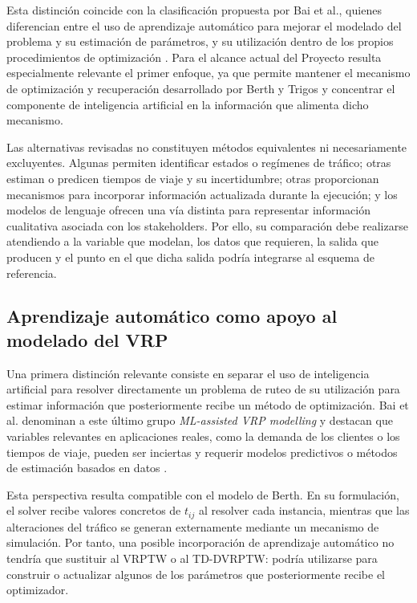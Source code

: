 \documentclass[11pt]{article}
\begin{document}
Esta distinción coincide con la clasificación propuesta por Bai et al., quienes
diferencian entre el uso de aprendizaje automático para mejorar el modelado del
problema y su estimación de parámetros, y su utilización dentro de los propios
procedimientos de optimización \parencite{bai_et_al_2023}. Para el alcance actual
del Proyecto resulta especialmente relevante el primer enfoque, ya que permite
mantener el mecanismo de optimización y recuperación desarrollado por Berth y
Trigos y concentrar el componente de inteligencia artificial en la información que
alimenta dicho mecanismo.

Las alternativas revisadas no constituyen métodos equivalentes ni necesariamente
excluyentes. Algunas permiten identificar estados o regímenes de tráfico; otras
estiman o predicen tiempos de viaje y su incertidumbre; otras proporcionan mecanismos
para incorporar información actualizada durante la ejecución; y los modelos de
lenguaje ofrecen una vía distinta para representar información cualitativa asociada
con los stakeholders. Por ello, su comparación debe realizarse atendiendo a la
variable que modelan, los datos que requieren, la salida que producen y el punto en
el que dicha salida podría integrarse al esquema de referencia.

\subsection{Aprendizaje automático como apoyo al modelado del VRP}

Una primera distinción relevante consiste en separar el uso de inteligencia artificial
para resolver directamente un problema de ruteo de su utilización para estimar
información que posteriormente recibe un método de optimización. Bai et al.
denominan a este último grupo \textit{ML-assisted VRP modelling} y destacan que
variables relevantes en aplicaciones reales, como la demanda de los clientes o los
tiempos de viaje, pueden ser inciertas y requerir modelos predictivos o métodos de
estimación basados en datos \parencite{bai_et_al_2023}.

Esta perspectiva resulta compatible con el modelo de Berth. En su formulación, el
solver recibe valores concretos de \(t_{ij}\) al resolver cada instancia, mientras que
las alteraciones del tráfico se generan externamente mediante un mecanismo de
simulación. Por tanto, una posible incorporación de aprendizaje automático no tendría
que sustituir al VRPTW o al TD-DVRPTW: podría utilizarse para construir o actualizar
algunos de los parámetros que posteriormente recibe el optimizador.
\end{document}
